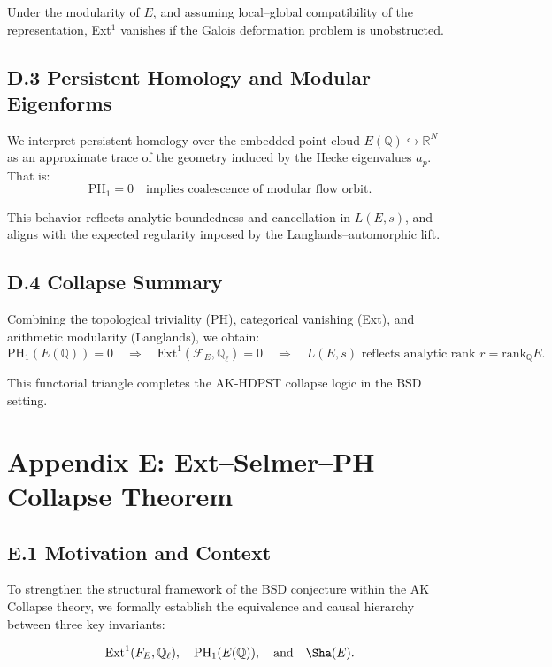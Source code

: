 Under the modularity of \( E \), and assuming local–global compatibility of the representation, Ext$^1$ vanishes if the Galois deformation problem is unobstructed.

\subsection*{D.3 Persistent Homology and Modular Eigenforms}

We interpret persistent homology over the embedded point cloud \( E(\mathbb{Q}) \hookrightarrow \mathbb{R}^N \) as an approximate trace of the geometry induced by the Hecke eigenvalues \( a_p \).  
That is:
\[
\mathrm{PH}_1 = 0 \quad \text{implies coalescence of modular flow orbit}.
\]

This behavior reflects analytic boundedness and cancellation in \( L(E, s) \), and aligns with the expected regularity imposed by the Langlands–automorphic lift.

\subsection*{D.4 Collapse Summary}

Combining the topological triviality (PH), categorical vanishing (Ext), and arithmetic modularity (Langlands), we obtain:
\[
\mathrm{PH}_1(E(\mathbb{Q})) = 0
\quad \Rightarrow \quad
\mathrm{Ext}^1(\mathcal{F}_E, \mathbb{Q}_\ell) = 0
\quad \Rightarrow \quad
L(E,s) \text{ reflects analytic rank } r = \mathrm{rank}_\mathbb{Q}E.
\]

This functorial triangle completes the AK-HDPST collapse logic in the BSD setting.



\section*{Appendix E: Ext--Selmer--PH Collapse Theorem}

\subsection*{E.1 Motivation and Context}

To strengthen the structural framework of the BSD conjecture within the AK Collapse theory,  
we formally establish the equivalence and causal hierarchy between three key invariants:

\[
\mathrm{Ext}^1(F_E, \mathbb{Q}_\ell), \quad \mathrm{PH}_1(E(\mathbb{Q})), \quad \text{and} \quad \Sha(E).
\]

